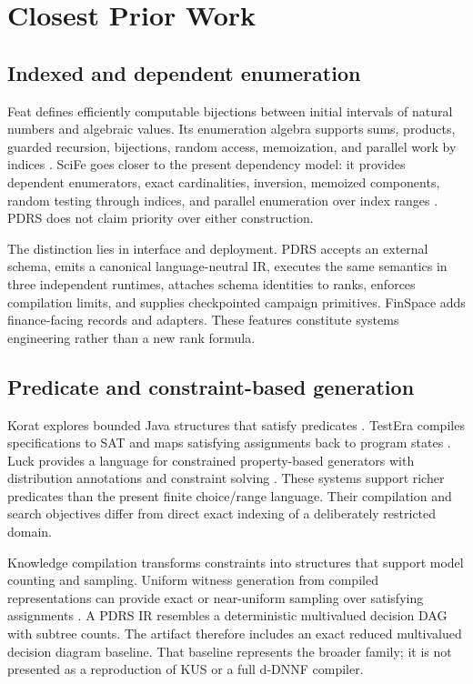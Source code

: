 \documentclass[10pt]{article}
\begin{document}
\section{Closest Prior Work}
\subsection{Indexed and dependent enumeration}
Feat defines efficiently computable bijections between initial intervals of natural numbers and algebraic values. Its enumeration algebra supports sums, products, guarded recursion, bijections, random access, memoization, and parallel work by indices \cite{feat2012}. SciFe goes closer to the present dependency model: it provides dependent enumerators, exact cardinalities, inversion, memoized components, random testing through indices, and parallel enumeration over index ranges \cite{scife2015}. PDRS does not claim priority over either construction.

The distinction lies in interface and deployment. PDRS accepts an external schema, emits a canonical language-neutral IR, executes the same semantics in three independent runtimes, attaches schema identities to ranks, enforces compilation limits, and supplies checkpointed campaign primitives. FinSpace adds finance-facing records and adapters. These features constitute systems engineering rather than a new rank formula.

\subsection{Predicate and constraint-based generation}
Korat explores bounded Java structures that satisfy predicates \cite{korat2002}. TestEra compiles specifications to SAT and maps satisfying assignments back to program states \cite{testera2004}. Luck provides a language for constrained property-based generators with distribution annotations and constraint solving \cite{luck2017}. These systems support richer predicates than the present finite choice/range language. Their compilation and search objectives differ from direct exact indexing of a deliberately restricted domain.

Knowledge compilation transforms constraints into structures that support model counting and sampling. Uniform witness generation from compiled representations can provide exact or near-uniform sampling over satisfying assignments \cite{kus2018}. A PDRS IR resembles a deterministic multivalued decision DAG with subtree counts. The artifact therefore includes an exact reduced multivalued decision diagram baseline. That baseline represents the broader family; it is not presented as a reproduction of KUS or a full d-DNNF compiler.
\end{document}
